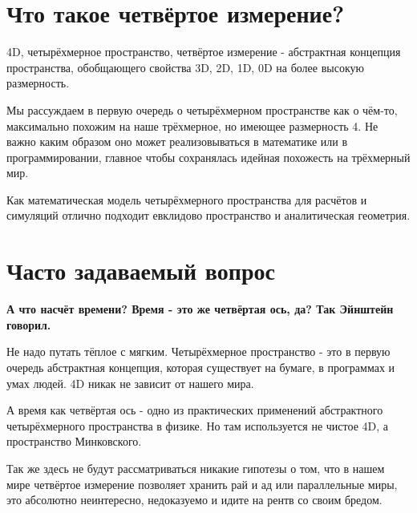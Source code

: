 \documentclass{universityreport}
\begin{document}
\appendix

\chapter{Что такое четвёртое измерение?}

4D, четырёхмерное пространство, четвёртое измерение - абстрактная концепция пространства, обобщающего свойства 3D, 2D, 1D, 0D на более высокую размерность.

Мы рассуждаем в первую очередь о четырёхмерном пространстве как о чём-то, максимально похожим на наше трёхмерное, но имеющее размерность 4. Не важно каким образом оно может реализовываться в математике или в программировании, главное чтобы сохранялась идейная похожесть на трёхмерный мир.

Как математическая модель четырёхмерного пространства для расчётов и симуляций отлично подходит евклидово пространство и аналитическая геометрия.

\chapter{Часто задаваемый вопрос}

\textbf{А что насчёт времени? Время - это же четвёртая ось, да? Так Эйнштейн говорил.}

Не надо путать тёплое с мягким. Четырёхмерное пространство - это в первую очередь абстрактная концепция, которая существует на бумаге, в программах и умах людей. 4D никак не зависит от нашего мира.

А время как четвёртая ось - одно из практических применений абстрактного четырёхмерного пространства в физике. Но там используется не чистое 4D, а пространство Минковского.

Так же здесь не будут рассматриваться никакие гипотезы о том, что в нашем мире четвёртое измерение позволяет хранить рай и ад или параллельные миры, это абсолютно неинтересно, недоказуемо и идите на рентв со своим бредом.
\end{document}

